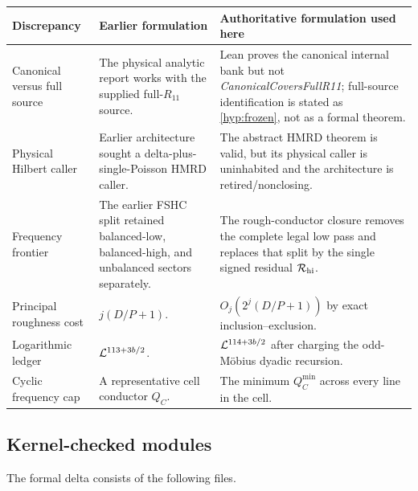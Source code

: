 \begin{center}
\small
\begin{tabularx}{\textwidth}{@{}p{}p{}X@{}}
\toprule
Discrepancy & Earlier formulation & Authoritative formulation used here \\
\midrule
Canonical versus full source
& The physical analytic report works with the supplied full-$R_{11}$ source.
& Lean proves the canonical internal bank but not
  \emph{CanonicalCoversFullR11}; full-source identification is stated as
  \cref{hyp:frozen}, not as a formal theorem. \\
\addlinespace
Physical Hilbert caller
& Earlier architecture sought a delta-plus-single-Poisson HMRD caller.
& The abstract HMRD theorem is valid, but its physical caller is uninhabited and
  the architecture is retired/nonclosing. \\
\addlinespace
Frequency frontier
& The earlier FSHC split retained balanced-low, balanced-high, and unbalanced
  sectors separately.
& The rough-conductor closure removes the complete legal low pass and replaces
  that split by the single signed residual $\mathcal R_{\mathrm{hi}}$. \\
\addlinespace
Principal roughness cost
& $j(D/P+1)$.
& $O_j(2^j(D/P+1))$ by exact inclusion--exclusion. \\
\addlinespace
Logarithmic ledger
& $\mathcal L^{113+3b/2}$.
& $\mathcal L^{114+3b/2}$ after charging the odd-M\"obius dyadic recursion. \\
\addlinespace
Cyclic frequency cap
& A representative cell conductor $Q_C$.
& The minimum $Q_C^{\min}$ across every line in the cell. \\
\bottomrule
\end{tabularx}
\end{center}

\subsection{Kernel-checked modules}

The formal delta consists of the following files.

